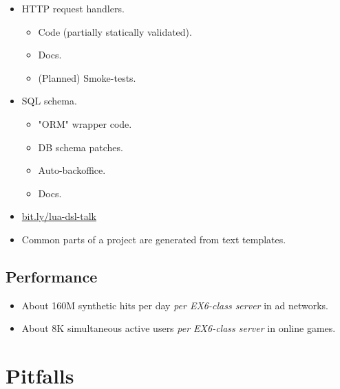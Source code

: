 \documentclass[aspectratio=169,handout,bigger]{beamer}
\begin{document}
\begin{frame}
  \begin{itemize}
    \item HTTP request handlers.
    \begin{itemize}
      \item Code (partially statically validated).
      \item Docs.
      \item (Planned) Smoke-tests.
    \end{itemize}
    \item SQL schema.
    \begin{itemize}
      \item "ORM" wrapper code.
      \item DB schema patches.
      \item Auto-backoffice.
      \item Docs.
    \end{itemize}
    \item \href{http://bit.ly/lua-dsl-talk}{bit.ly/lua-dsl-talk}
    \item Common parts of a project are generated from text templates.
  \end{itemize}
\end{frame}


\subsection*{Performance}

\begin{frame}
  \begin{itemize}
    \item About 160M synthetic hits per day \emph{per EX6-class server} in ad networks.
    \item About 8K simultaneous active users \emph{per EX6-class server} in online games.
  \end{itemize}
\end{frame}


\section{Pitfalls}

\end{document}
